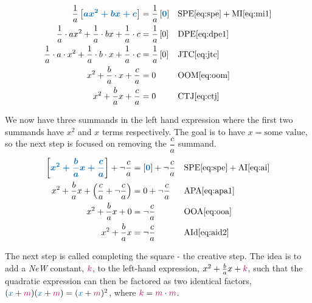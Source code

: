 \documentclass[20150903-160354-rs2.2-MarksMathNotebook.tex]{subfiles}
\begin{document}
\begin{align*}
\dfrac{1}{a} \farg{ax^2 + bx +c} & = \dfrac{1}{a} \farg{0} && \text{SPE} \eqref{eq:spe} + \text{MI} \eqref{eq:mi1} \\
\dfrac{1}{a} \cdot ax^2 + \dfrac{1}{a} \cdot bx + \dfrac{1}{a} \cdot c  & = \dfrac{1}{a} \left[ 0\right] && \text{DPE} \eqref{eq:dpe1} \\
\dfrac{1}{a} \cdot a \cdot x^2 + \dfrac{1}{a} \cdot b \cdot x + \dfrac{1}{a} \cdot c  & = \dfrac{1}{a} \left[ 0\right] && \text{JTC} \eqref{eq:jtc} \\
x^2 + \dfrac{b}{a} \cdot x + \dfrac{c}{a} & = 0 && \text{OOM} \eqref{eq:oom} \\
x^2 +\dfrac{b}{a}x + \dfrac{c}{a}  & = 0 && \text{CTJ} \eqref{eq:ctj}
\end{align*}

We now have three summands in the left hand expression where the first two summands have $x^2$ and $x$ terms respectively.  The goal is to have $x=\text{some value}$, so the next step is focused on removing the  $\dfrac{c}{a}$ summand.\\

\begin{align*}
\farg{x^2 +\dfrac{b}{a}x + \dfrac{c}{a}}  + \neg \dfrac{c}{a}  & = \farg{ 0 } + \neg \dfrac{c}{a} &&  \text{SPE} \eqref{eq:spe} + \text{AI} \eqref{eq:ai} \\
x^2 +\dfrac{b}{a}x + \left(\dfrac{c}{a} + \neg \dfrac{c}{a} \right)  & = 0  + \neg \dfrac{c}{a} && \text{APA} \eqref{eq:apa1} \\
x^2 +\dfrac{b}{a}x + 0 & = \neg \dfrac{c}{a} && \text{OOA} \eqref{eq:ooa} \\
x^2 +\dfrac{b}{a}x & = \neg \dfrac{c}{a} && \text{AId} \eqref{eq:aid2} 
\end{align*}

The next step is called completing the square - the creative step.  The idea is to add a \textit{NeW} constant, $\color{sthlmRed}k$, to the left-hand expression, $x^2 +\frac{b}{a}x+\color{sthlmRed}k$,  such that the quadratic expression can then be factored as two identical factors, $({\color{sthlmBlue}x}+{\color{sthlmRed}m})({\color{sthlmBlue}x}+{\color{sthlmRed}m}) = ({\color{sthlmBlue}x}+{\color{sthlmRed}m})^2$, where  ${{\color{sthlmRed}k}=\color{sthlmRed}m} \cdot {\color{sthlmRed}m}$.  
\end{document}
